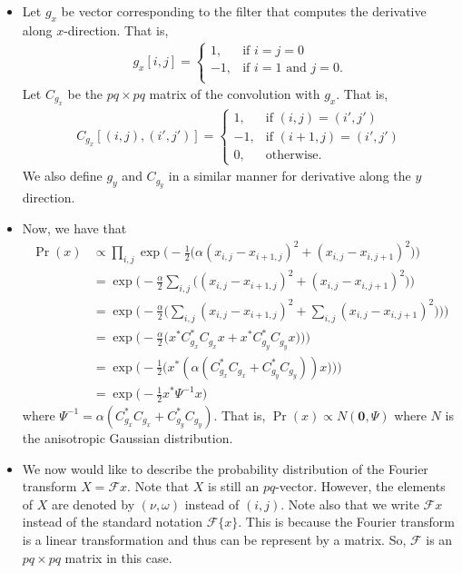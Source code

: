 \documentclass[10pt]{article}
\newcommand{\ve}[1]{\mathbf{#1}}
\begin{document}
\begin{itemize}
  \item Let $g_x$ be vector corresponding to the filter that computes the derivative along $x$-direction. That is,
  \begin{align*}
    g_x[i,j] = \begin{cases}
      1, & \mbox{if } i = j = 0\\
      -1, & \mbox{if } i = 1 \mbox{ and } j = 0.\\
    \end{cases}    
  \end{align*}
  Let $C_{g_x}$ be the $pq \times pq$ matrix of the convolution with $g_x$. That is,
  \begin{align*}
    C_{g_x}[(i,j), (i',j')] = \begin{cases}
      1, & \mbox{if }(i,j) = (i',j')\\
      -1, & \mbox{if }(i+1,j) = (i',j')\\
      0, & \mbox{otherwise}.
    \end{cases}
  \end{align*}
  We also define $g_y$ and $C_{g_y}$ in a similar manner for derivative along the $y$ direction.
  
  \item Now, we have that
  \begin{align*}
    \Pr(x) 
    &\propto \prod_{i,j} \exp\bigg(-\frac{1}{2}\big( \alpha (x_{i,j} - x_{i+1,j})^2 + (x_{i,j} - x_{i,j+1})^2 \big) \bigg)\\
    &= \exp\bigg(-\frac{\alpha}{2}\sum_{i,j} \big(  (x_{i,j} - x_{i+1,j})^2 + (x_{i,j} - x_{i,j+1})^2 \big) \bigg)\\
    &= \exp\bigg(-\frac{\alpha}{2}\Big( \sum_{i,j} (x_{i,j} - x_{i+1,j})^2 + \sum_{i,j} (x_{i,j} - x_{i,j+1})^2 \big) \Big) \bigg)\\
    &= \exp\bigg(-\frac{\alpha}{2}\Big( x^* C_{g_x}^* C_{g_x} x + x^* C_{g_y}^* C_{g_y} x \big) \Big) \bigg)\\
    &= \exp\bigg(-\frac{1}{2}\Big( x^* (\alpha  (C_{g_x}^* C_{g_x} + C_{g_y}^* C_{g_y}) ) x \big) \Big) \bigg)\\
    &= \exp\bigg(-\frac{1}{2} x^* \Psi^{-1} x \bigg)
  \end{align*}
  where $\Psi^{-1} = \alpha  (C_{g_x}^* C_{g_x} + C_{g_y}^* C_{g_y}).$ That is, $\Pr(x) \propto N(\ve{0}, \Psi)$ where $N$ is the anisotropic Gaussian distribution.
  
  \item We now would like to describe the probability distribution of the Fourier transform $X = \mathcal{F} x.$ Note that $X$ is still an $pq$-vector. However, the elements of $X$ are denoted by $(\nu,\omega)$ instead of $(i,j)$. Note also that we write $\mathcal{F}x$ instead of the standard notation $\mathcal{F}\{ x \}$. This is because the Fourier transform is a linear transformation and thus can be represent by a matrix. So, $\mathcal{F}$ is an $pq \times pq$ matrix in this case.
  

\end{itemize}
\end{document}
